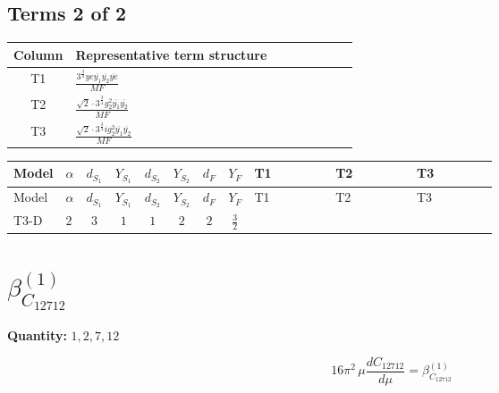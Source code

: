 \documentclass[8pt]{article}
\begin{document}
\begin{landscape}
\subsection*{Terms 2 of 2}
\begin{center}
\begin{tabular}{@{}c >{\raggedright\arraybackslash}p{0.82\linewidth}@{}}
\toprule
Column & Representative term structure \\
\midrule
T1 & \(\displaystyle \frac{3^{\frac{3}{4}} ye \overline{y_{1}} \overline{y_{2}} \overline{ye}}{MF}\) \\
\midrule
T2 & \(\displaystyle \frac{\sqrt{2} \cdot 3^{\frac{3}{4}} g_{2}^{2} \overline{y_{1}} \overline{y_{2}}}{MF}\) \\
\midrule
T3 & \(\displaystyle \frac{\sqrt{2} \cdot 3^{\frac{3}{4}} i g_{2}^{2} \overline{y_{1}} \overline{y_{2}}}{MF}\) \\
\midrule
\bottomrule
\end{tabular}
\end{center}
\smallskip
\tiny
\begin{longtable}{@{}llcccccc >{\raggedright\arraybackslash}p{0.21\linewidth} >{\raggedright\arraybackslash}p{0.21\linewidth} >{\raggedright\arraybackslash}p{0.21\linewidth}@{}}
\toprule
Model & $\alpha$ & $d_{S_1}$ & $Y_{S_1}$ & $d_{S_2}$ & $Y_{S_2}$ & $d_F$ & $Y_F$ & T1 & T2 & T3 \\
\midrule
\endfirsthead
\toprule
Model & $\alpha$ & $d_{S_1}$ & $Y_{S_1}$ & $d_{S_2}$ & $Y_{S_2}$ & $d_F$ & $Y_F$ & T1 & T2 & T3 \\
\midrule
\endhead
T3-D & $2$ & $3$ & $1$ & $1$ & $2$ & $2$ & $\frac{3}{2}$ & \scriptsize\adjustbox{max width=\linewidth}{$\begin{gathered} - \frac{3^{\frac{3}{4}} ye \overline{y_{1}} \overline{y_{2}} \overline{ye}}{12 MF}\end{gathered}$} & \scriptsize\adjustbox{max width=\linewidth}{$\begin{gathered} \frac{\sqrt{2} \cdot 3^{\frac{3}{4}} g_{2}^{2} \overline{y_{1}} \overline{y_{2}}}{6 MF}\end{gathered}$} & \scriptsize\adjustbox{max width=\linewidth}{$\begin{gathered} \frac{\sqrt{2} \cdot 3^{\frac{3}{4}} i g_{2}^{2} \overline{y_{1}} \overline{y_{2}}}{6 MF}\end{gathered}$} \\
\midrule
\bottomrule
\end{longtable}
\clearpage
\section*{$\beta_{C_{12712}}^{(1)}$}
\noindent\textbf{Quantity: }$\mathrm{1,2,7,12}$\par\smallskip
\[16\pi^2\,\mu\frac{d C_{12712}}{d\mu}=\beta_{C_{12712}}^{(1)}\]

\end{landscape}
\end{document}
